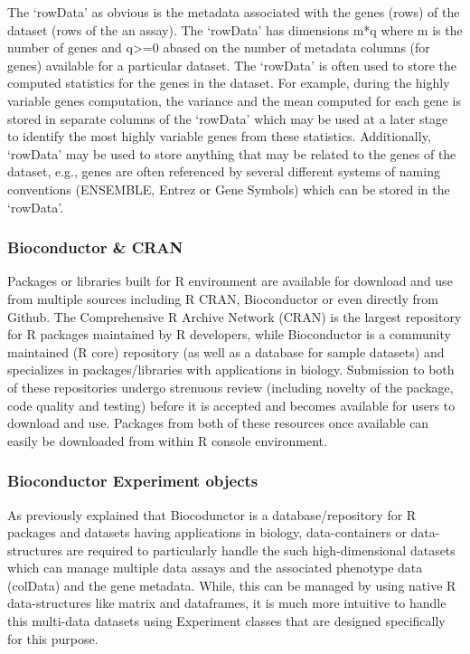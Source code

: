 \documentclass[
]{article}
\begin{document}
The `rowData' as obvious is the metadata associated with the genes
(rows) of the dataset (rows of the an assay). The `rowData' has
dimensions m*q where m is the number of genes and q\textgreater=0 abased
on the number of metadata columns (for genes) available for a particular
dataset. The `rowData' is often used to store the computed statistics
for the genes in the dataset. For example, during the highly variable
genes computation, the variance and the mean computed for each gene is
stored in separate columns of the `rowData' which may be used at a later
stage to identify the most highly variable genes from these statistics.
Additionally, `rowData' may be used to store anything that may be
related to the genes of the dataset, e.g., genes are often referenced by
several different systems of naming conventions (ENSEMBLE, Entrez or
Gene Symbols) which can be stored in the `rowData'.

\hypertarget{bioconductor-cran}{%
\subsubsection{Bioconductor \& CRAN}\label{bioconductor-cran}}

Packages or libraries built for R environment are available for download
and use from multiple sources including R CRAN, Bioconductor or even
directly from Github. The Comprehensive R Archive Network (CRAN) is the
largest repository for R packages maintained by R developers, while
Bioconductor is a community maintained (R core) repository (as well as a
database for sample datasets) and specializes in packages/libraries with
applications in biology. Submission to both of these repositories
undergo strenuous review (including novelty of the package, code quality
and testing) before it is accepted and becomes available for users to
download and use. Packages from both of these resources once available
can easily be downloaded from within R console environment.

\hypertarget{bioconductor-experiment-objects}{%
\subsubsection{Bioconductor Experiment
objects}\label{bioconductor-experiment-objects}}

As previously explained that Biocodunctor is a database/repository for R
packages and datasets having applications in biology, data-containers or
data-structures are required to particularly handle the such
high-dimensional datasets which can manage multiple data assays and the
associated phenotype data (colData) and the gene metadata. While, this
can be managed by using native R data-structures like matrix and
dataframes, it is much more intuitive to handle this multi-data datasets
using Experiment classes that are designed specifically for this
purpose.
\end{document}
